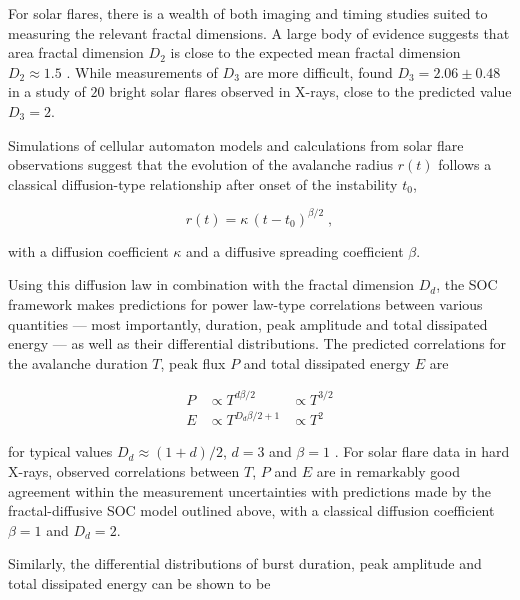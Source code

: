 \documentclass[12pt]{emulateapj}
\begin{document}
For solar flares, there is a wealth of both imaging and timing studies suited to measuring the relevant fractal dimensions. A large body of evidence suggests that area fractal dimension $D_2$ is
close to the expected mean fractal dimension $D_2 \approx 1.5$ \citep[see Table 8 in ][ and references therein]{aschwanden2014}. 
While measurements of $D_3$ are more difficult, \citet{aschwanden2008} found $D_3 = 2.06 \pm 0.48$
in a study of $20$ bright solar flares observed in X-rays, close to the predicted value $D_3 = 2$. 

Simulations of cellular automaton models \citep{aschwanden2012a} and calculations from solar flare observations \citep{aschwanden2012b,aschwanden2013a,aschwanden2013b} 
suggest that the evolution of the avalanche radius $r(t)$ follows a classical diffusion-type relationship after onset of the instability $t_0$, 

\begin{equation}
r(t) = \kappa\,(t- t_0)^{\beta/2}\; ,
\end{equation}

with a diffusion coefficient $\kappa$ and a diffusive spreading coefficient $\beta$.

Using this diffusion law in combination with the fractal dimension $D_d$, the SOC framework makes predictions for 
power law-type correlations between various quantities --- most importantly, duration, 
peak amplitude and total dissipated energy ---  as well as their differential distributions.
The predicted correlations for the avalanche duration $T$, peak flux $P$ and total dissipated energy $E$ are

\begin{eqnarray}
P & \propto  T^{d\beta/2} &\propto  T^{3/2} \\ 
E &\propto   T^{D_d\beta/2 + 1} & \propto  T^{2} 
\end{eqnarray}

for typical values $D_d \approx (1+d)/2$, $d = 3$  and  $\beta = 1$ \citep[see ][ and references therein for details of the derivation]{aschwanden2014}. 
For solar flare data in hard X-rays, observed correlations between $T$, $P$ and $E$ are in remarkably good agreement within the measurement
uncertainties with predictions made by the fractal-diffusive SOC model outlined above, with a classical diffusion coefficient $\beta = 1$ and $D_d = 2$.

Similarly, the differential distributions of burst duration, peak amplitude and total dissipated energy can be shown to be
\end{document}
